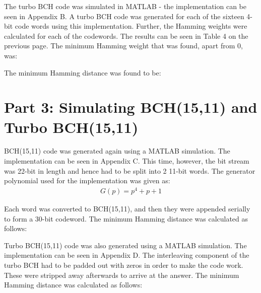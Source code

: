 \documentclass{article}
\begin{document}
The turbo BCH code was simulated in MATLAB - the implementation can be seen in Appendix B. A turbo BCH code was generated for each of the sixteen 4-bit code words using this implementation. Further, the Hamming weights were calculated for each of the codewords. The results can be seen in Table 4 on the previous page. The minimum Hamming weight that was found, apart from 0, was:
\begin{center}
\end{center}

\vspace{0.5cm}

The minimum Hamming distance was found to be: 
\begin{center}
\end{center}


\section{Part 3: Simulating BCH(15,11) and Turbo BCH(15,11)}
BCH(15,11) code was generated again using a MATLAB simulation. The implementation can be seen in Appendix C. This time, however, the bit stream was 22-bit in length and hence had to be split into 2 11-bit words. The generator polynomial used for the implementation was given as:
\begin{align*}
	G(p) = p^4 + p + 1
\end{align*}

Each word was converted to BCH(15,11), and then they were appended serially to form a 30-bit codeword. The minimum Hamming distance was calculated as follows:
\begin{center}
\end{center}

Turbo BCH(15,11) code was also generated using a MATLAB simulation. The implementation can be seen in Appendix D. The interleaving component of the turbo BCH had to be padded out with zeros in order to make the code work. These were stripped away afterwards to arrive at the answer. The minimum Hamming distance was calculated as follows:
\begin{center}
\end{center} 
\end{document}
